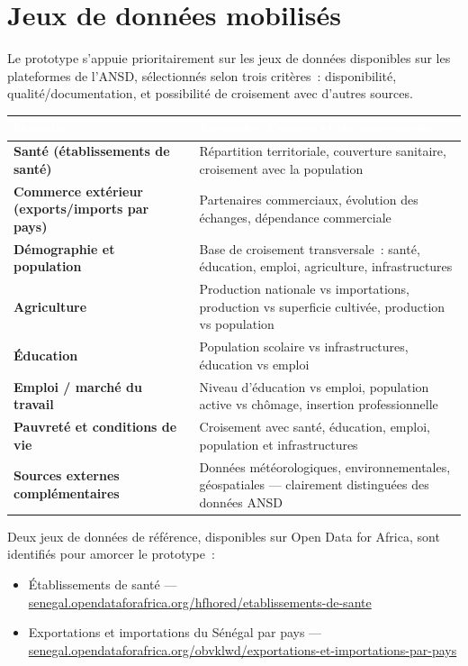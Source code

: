 \documentclass[11pt,a4paper]{article}
\begin{document}
\section{Jeux de données mobilisés}

Le prototype s'appuie prioritairement sur les jeux de données disponibles sur les plateformes de l'ANSD, sélectionnés selon trois critères~: disponibilité, qualité/documentation, et possibilité de croisement avec d'autres sources.

\begin{longtable}{@{}>{\bfseries}p{4.6cm} p{9.9cm}@{}}
\rowcolor{navy}
\textcolor{white}{Domaine} & \textcolor{white}{Exemples d'usages et de croisements} \\
\endhead
Santé (établissements de santé) & Répartition territoriale, couverture sanitaire, croisement avec la population \\
Commerce extérieur (exports/imports par pays) & Partenaires commerciaux, évolution des échanges, dépendance commerciale \\
Démographie et population & Base de croisement transversale~: santé, éducation, emploi, agriculture, infrastructures \\
Agriculture & Production nationale vs importations, production vs superficie cultivée, production vs population \\
Éducation & Population scolaire vs infrastructures, éducation vs emploi \\
Emploi / marché du travail & Niveau d'éducation vs emploi, population active vs chômage, insertion professionnelle \\
Pauvreté et conditions de vie & Croisement avec santé, éducation, emploi, population et infrastructures \\
Sources externes complémentaires & Données météorologiques, environnementales, géospatiales --- clairement distinguées des données ANSD \\
\end{longtable}

Deux jeux de données de référence, disponibles sur Open Data for Africa, sont identifiés pour amorcer le prototype~:
\begin{itemize}
  \item \small Établissements de santé --- \url{senegal.opendataforafrica.org/hfhored/etablissements-de-sante}
  \item \small Exportations et importations du Sénégal par pays --- \url{senegal.opendataforafrica.org/obvklwd/exportations-et-importations-par-pays}
\end{itemize}
\normalsize
\end{document}
